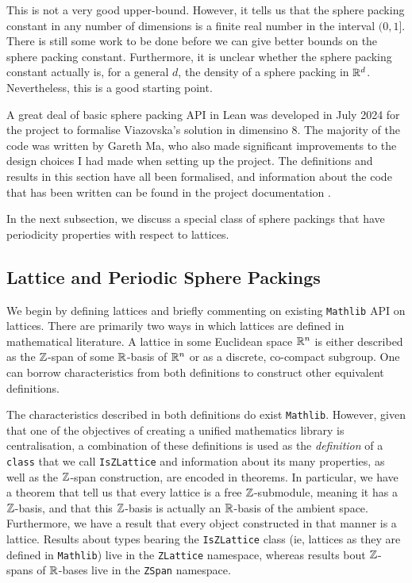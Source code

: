 This is not a very good upper-bound. However, it tells us that the sphere packing constant in any number of dimensions is a finite real number in the interval $(0, 1]$. There is still some work to be done before we can give better bounds on the sphere packing constant. Furthermore, it is unclear whether the sphere packing constant actually is, for a general $d$, the density of a sphere packing in $\mathbb{R}^d$. Nevertheless, this is a good starting point.

A great deal of basic sphere packing API in Lean was developed in July 2024 for the project to formalise Viazovska's solution in dimensino $8$. The majority of the code was written by Gareth Ma, who also made significant improvements to the design choices I had made when setting up the project. The definitions and results in this section have all been formalised, and information about the code that has been written can be found in the project documentation \cite[\texttt{SpherePacking.Basic.SpherePacking}]{documentation}.

In the next subsection, we discuss a special class of sphere packings that have periodicity properties with respect to lattices.

\subsection{Lattice and Periodic Sphere Packings}

We begin by defining lattices and briefly commenting on existing \verb|Mathlib| API on lattices. There are primarily two ways in which lattices are defined in mathematical literature. A lattice in some Euclidean space $\mathbb{R}^n$ is either described as the $\mathbb{Z}$-span of some $\mathbb{R}$-basis of $\mathbb{R}^n$ or as a discrete, co-compact subgroup. One can borrow characteristics from both definitions to construct other equivalent definitions.

The characteristics described in both definitions do exist \verb|Mathlib|. However, given that one of the objectives of creating a unified mathematics library is centralisation, a combination of these definitions is used as the \textit{definition} of a \verb|class| that we call \verb|IsZLattice| and information about its many properties, as well as the $\mathbb{Z}$-span construction, are encoded in theorems. In particular, we have a theorem that tell us that every lattice is a free $\mathbb{Z}$-submodule, meaning it has a $\mathbb{Z}$-basis, and that this $\mathbb{Z}$-basis is actually an $\mathbb{R}$-basis of the ambient space. Furthermore, we have a result that every object constructed in that manner is a lattice. Results about types bearing the \verb|IsZLattice| class (ie, lattices as they are defined in \verb|Mathlib|) live in the \verb|ZLattice| namespace, whereas results bout $\mathbb{Z}$-spans of $\mathbb{R}$-bases live in the \verb|ZSpan| namespace. 


